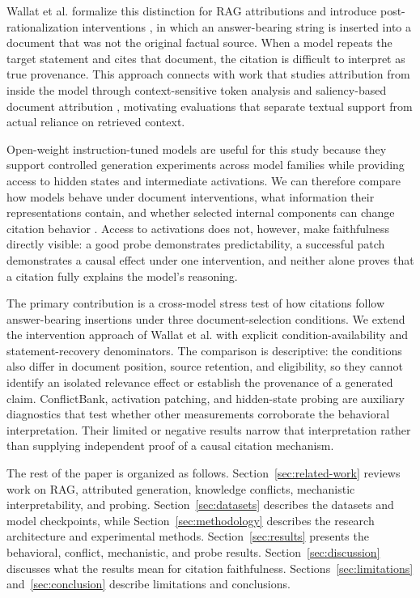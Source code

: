 \documentclass[a4paper,fleqn]{cas-sc}
\begin{document}
Wallat et al. formalize this distinction for RAG attributions and introduce post-rationalization interventions \cite{wallat2025correctness}, in which an answer-bearing string is inserted into a document that was not the original factual source. When a model repeats the target statement and cites that document, the citation is difficult to interpret as true provenance. This approach connects with work that studies attribution from inside the model through context-sensitive token analysis and saliency-based document attribution \cite{qi2024mirage}, motivating evaluations that separate textual support from actual reliance on retrieved context.

Open-weight instruction-tuned models are useful for this study because they support controlled generation experiments across model families while providing access to hidden states and intermediate activations. We can therefore compare how models behave under document interventions, what information their representations contain, and whether selected internal components can change citation behavior \cite{leon2025gpt}. Access to activations does not, however, make faithfulness directly visible: a good probe demonstrates predictability, a successful patch demonstrates a causal effect under one intervention, and neither alone proves that a citation fully explains the model's reasoning.

The primary contribution is a cross-model stress test of how citations follow answer-bearing insertions under three document-selection conditions. We extend the intervention approach of Wallat et al. \cite{wallat2025correctness} with explicit condition-availability and statement-recovery denominators. The comparison is descriptive: the conditions also differ in document position, source retention, and eligibility, so they cannot identify an isolated relevance effect or establish the provenance of a generated claim. ConflictBank, activation patching, and hidden-state probing are auxiliary diagnostics that test whether other measurements corroborate the behavioral interpretation. Their limited or negative results narrow that interpretation rather than supplying independent proof of a causal citation mechanism.

The rest of the paper is organized as follows. Section~\ref{sec:related-work} reviews work on RAG, attributed generation, knowledge conflicts, mechanistic interpretability, and probing. Section~\ref{sec:datasets} describes the datasets and model checkpoints, while Section~\ref{sec:methodology} describes the research architecture and experimental methods. Section~\ref{sec:results} presents the behavioral, conflict, mechanistic, and probe results. Section~\ref{sec:discussion} discusses what the results mean for citation faithfulness. Sections~\ref{sec:limitations} and~\ref{sec:conclusion} describe limitations and conclusions.
\end{document}
